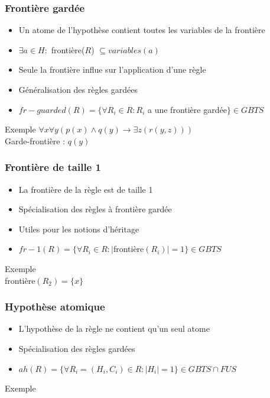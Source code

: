 \begin{frame}
	\frametitle{Frontière gardée}
	\begin{itemize}
		\item Un atome de l'hypothèse contient toutes les variables de la frontière
		\item $\exists a \in H :$ frontière($R$) $\subseteq variables(a)$
		\item Seule la frontière influe sur l'application d'une règle
		\item Généralisation des règles gardées
		\item $fr-guarded(R) = \{\forall R_i \in R : R_i $ a une frontière gardée$\} \in GBTS$
	\end{itemize}
	\begin{exampleblock}{Exemple}
		$\forall x \forall y (p(x) \wedge q(y) \rightarrow \exists z (r(y,z)))$\\
		Garde-frontière : $q(y)$
	\end{exampleblock}
\end{frame}

\begin{frame}
	\frametitle{Frontière de taille 1}
	\begin{itemize}
		\item La frontière de la règle est de taille 1
		\item Spécialisation des règles à frontière gardée
		\item Utiles pour les notions d'héritage
		\item $fr-1(R) = \{\forall R_i \in R : |$frontière$(R_i)| = 1 \} \in GBTS$
	\end{itemize}
	\begin{exampleblock}{Exemple}
		 \\
		frontière$(R_2) = \{x\}$
	\end{exampleblock}
\end{frame}

\begin{frame}
	\frametitle{Hypothèse atomique}
	\begin{itemize}
		\item L'hypothèse de la règle ne contient qu'un seul atome
		\item Spécialisation des règles gardées
		\item $ah(R) = \{\forall R_i = (H_i,C_i) \in R : |H_i| = 1 \} \in GBTS \cap FUS$
	\end{itemize}
	\begin{exampleblock}{Exemple}
	\end{exampleblock}
\end{frame}

